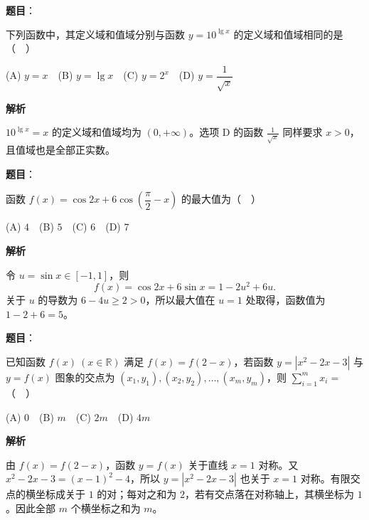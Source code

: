 \begin{answer}

\textbf{题目}：

下列函数中，其定义域和值域分别与函数 $y=10^{\lg x}$ 的定义域和值域相同的是（　）

   (A) $y=x$　(B) $y=\lg x$　(C) $y=2^x$　(D) $y=\dfrac1{\sqrt{x}}$

\textbf{解析}

$10^{\lg x}=x$ 的定义域和值域均为 $(0,+\infty)$。选项 D 的函数 $\frac1{\sqrt{x}}$ 同样要求 $x>0$，且值域也是全部正实数。


\end{answer}
\begin{answer}

\textbf{题目}：

函数 $f(x)=\cos 2x+6\cos\left(\dfrac\pi2-x\right)$ 的最大值为（　）

   (A) $4$　(B) $5$　(C) $6$　(D) $7$

\textbf{解析}

令 $u=\sin x\in[-1,1]$，则
\nopagebreak[4]
\[
f(x)=\cos2x+6\sin x=1-2u^2+6u.
\]
关于 $u$ 的导数为 $6-4u\ge2>0$，所以最大值在 $u=1$ 处取得，函数值为 $1-2+6=5$。


\end{answer}
\begin{answer}

\textbf{题目}：

已知函数 $f(x)\ (x\in\mathbb R)$ 满足 $f(x)=f(2-x)$，若函数 $y=|x^2-2x-3|$ 与 $y=f(x)$ 图象的交点为 $(x_1,y_1),(x_2,y_2),\ldots,(x_m,y_m)$，则 $\displaystyle\sum_{i=1}^{m}x_i=$（　）

   (A) $0$　(B) $m$　(C) $2m$　(D) $4m$

\textbf{解析}

由 $f(x)=f(2-x)$，函数 $y=f(x)$ 关于直线 $x=1$ 对称。又
$x^2-2x-3=(x-1)^2-4$，所以 $y=|x^2-2x-3|$ 也关于 $x=1$ 对称。有限交点的横坐标成关于 $1$ 的对；每对之和为 $2$，若有交点落在对称轴上，其横坐标为 $1$。因此全部 $m$ 个横坐标之和为 $m$。


\end{answer}

